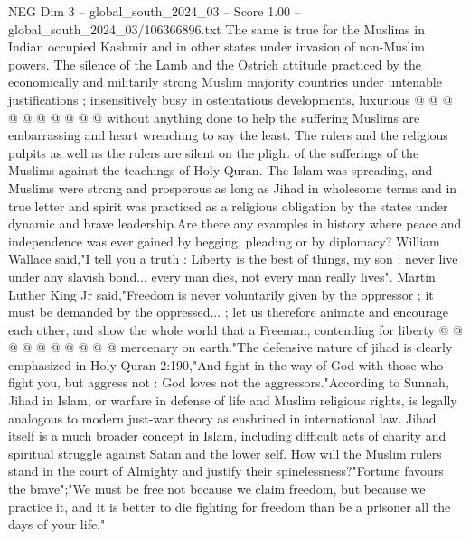 \begin{textsample}{NEG Dim 3 – global\_south\_2024\_03 – Score 1.00 – global\_south\_2024\_03/106366896.txt}
The same is true for the Muslims in Indian occupied Kashmir and in other states under invasion of non-Muslim powers.
The silence of the Lamb and the Ostrich attitude practiced by the economically and militarily strong Muslim majority countries under untenable justifications ; insensitively busy in ostentatious developments, luxurious @ @ @ @ @ @ @ @ @ @ without anything done to help the suffering Muslims are embarrassing and heart wrenching to say the least.
The rulers and the religious pulpits as well as the rulers are silent on the plight of the sufferings of the Muslims against the teachings of Holy Quran.
The Islam was spreading, and Muslims were strong and prosperous as long as Jihad in wholesome terms and in true letter and spirit was practiced as a religious obligation by the states under dynamic and brave leadership.Are there any examples in history where peace and independence was ever gained by begging, pleading or by diplomacy?
William Wallace said,"I tell you a truth : Liberty is the best of things, my son ; never live under any slavish bond... every man dies, not every man really lives".
Martin Luther King Jr said,"Freedom is never voluntarily given by the oppressor ; it must be demanded by the oppressed... ; let us therefore animate and encourage each other, and show the whole world that a Freeman, contending for liberty @ @ @ @ @ @ @ @ @ @ mercenary on earth."The defensive nature of jihad is clearly emphasized in Holy Quran 2:190,"And fight in the way of God with those who fight you, but aggress not : God loves not the aggressors."According to Sunnah, Jihad in Islam, or warfare in defense of life and Muslim religious rights, is legally analogous to modern just-war theory as enshrined in international law.
Jihad itself is a much broader concept in Islam, including difficult acts of charity and spiritual struggle against Satan and the lower self.
How will the Muslim rulers stand in the court of Almighty and justify their spinelessness?"Fortune favours the brave";"We must be free not because we claim freedom, but because we practice it, and it is better to die fighting for freedom than be a prisoner all the days of your life."

\end{textsample}
